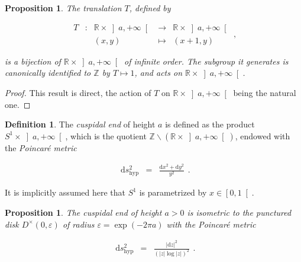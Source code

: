 \documentclass{jams-l}
\newtheorem{proposition}[theorem]{Proposition}
\theoremstyle{definition}
\newtheorem{definition}[theorem]{Definition}
\theoremstyle{remark}
\numberwithin{equation}{section}
\begin{document}
        \begin{proposition}
                
            The translation $T$, defined by
            
            \[ \begin{array}{lllll}
                    T & : & \mathbb{R} \times \left] a, + \infty \right[ & \longrightarrow & \mathbb{R} \times \left] a, + \infty \right[ \\[0.5em]
                    && \left( x, y \right) & \longmapsto & \left( x+1, y \right)
                \end{array} , \]
            
            \noindent is a bijection of $\mathbb{R} \times \left] a, + \infty \right[$ of infinite order. The subgroup it generates is canonically identified to $\mathbb{Z}$ by $T \mapsto 1$, and acts on $\mathbb{R} \times \left] a, + \infty \right[$.
            
        \end{proposition}
        
        \begin{proof}
        
            This result is direct, the action of $T$ on $\mathbb{R} \times \left] a, + \infty \right[$ being the natural one.
        
        \end{proof}
        
        \begin{definition}
        
            The \textit{cuspidal end} of height $a$ is defined as the product $S^1 \times \left] a, + \infty \right[$, which is the quotient $\mathbb{Z} \backslash \left( \mathbb{R} \times \left] a, + \infty \right[ \right)$, endowed with the \textit{Poincaré metric}
            
            \[ \begin{array}{lll}
                    \mathrm{d}s^2_{\mathrm{hyp}} & = & \frac{\mathrm{d}x^2 + \mathrm{d}y^2}{y^2}
                \end{array} . \]
            
            \noindent It is implicitly assumed here that $S^1$ is parametrized by $x \in \left[ 0, 1 \right[$.
        
        \end{definition}
        
        \begin{proposition}
        
            The cuspidal end of height $a > 0$ is isometric to the punctured disk $D^{\times} \left( 0, \varepsilon \right)$ of radius $\varepsilon = \exp \left( - 2 \pi a \right)$ with the Poincar\'{e} metric
            
            \[ \begin{array}{lll}
                    \mathrm{d}s^2_{\mathrm{hyp}} & = & \frac{\left\vert \mathrm{d} z \right \vert^2}{\left( \left \vert z \right \vert \log \left \vert z \right\vert \right)^2}
                \end{array} . \]
        
        \end{proposition}
        
\end{document}

